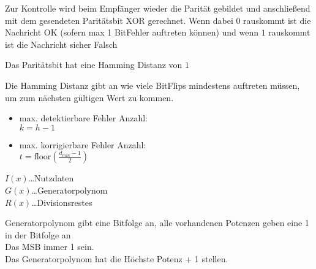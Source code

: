 \documentclass[letterpaper,10pt,english]{jupyterBook}
\begin{document}
\sphinxAtStartPar
Zur Kontrolle wird beim Empfänger wieder die Parität gebildet
und anschließend mit dem gesendeten Paritätsbit XOR gerechnet.
Wenn dabei \(0\) rauskommt ist die Nachricht OK (sofern max 1 Bit\sphinxhyphen{}Fehler auftreten können)
und wenn \(1\) rauskommt ist die Nachricht sicher Falsch

\sphinxAtStartPar
Das Paritätsbit hat eine Hamming Distanz von \(1\)

\begin{DUlineblock}{0em}
\item[] 
\end{DUlineblock}

\sphinxAtStartPar
Die Hamming Distanz gibt an wie viele Bit\sphinxhyphen{}Flips mindestens auftreten müssen,
um zum nächsten gültigen Wert zu kommen.
\begin{itemize}
\item {} 
\sphinxAtStartPar
max. detektierbare Fehler Anzahl:\\
\(k = h-1\)

\item {} 
\sphinxAtStartPar
max. korrigierbare Fehler Anzahl:\\
\(t = \text{floor}\left(\frac{d_{min} - 1}{2}\right)\)

\end{itemize}

\begin{DUlineblock}{0em}
\item[] 
\end{DUlineblock}

\begin{DUlineblock}{0em}
\item[] 
\end{DUlineblock}

\sphinxAtStartPar
{}

\begin{DUlineblock}{0em}
\item[] 
\end{DUlineblock}

\sphinxAtStartPar
\(I(x)\)…Nutzdaten\\
\(G(x)\)…Generatorpolynom\\
\(R(x)\)…Divisionsrestes

\sphinxAtStartPar
Generatorpolynom gibt eine Bitfolge an,
alle vorhandenen Potenzen geben eine 1 in der Bitfolge an\\
Das MSB  immer 1 sein.\\
Das Generatorpolynom hat die Höchste Potenz + 1 stellen.
\end{document}
